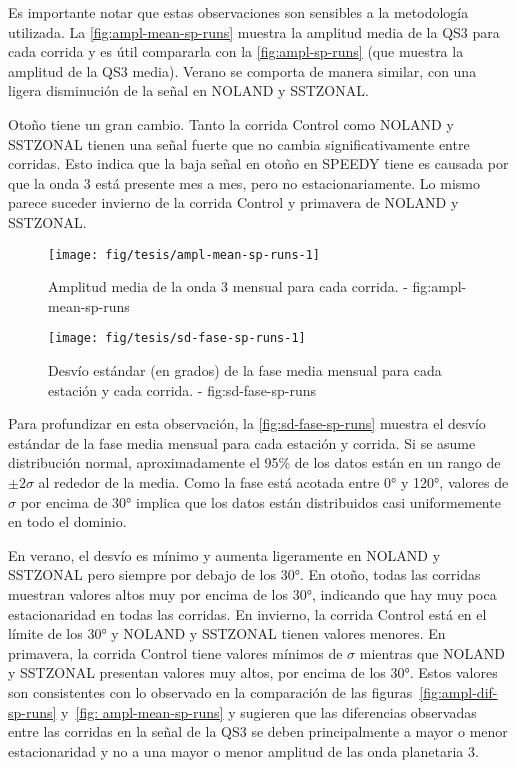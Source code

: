 \documentclass[spanish,a4paper,12p]{book}
\begin{document}
Es importante notar que estas observaciones son sensibles a la
metodología utilizada. La \autoref{fig:ampl-mean-sp-runs} muestra la
amplitud media de la QS3 para cada corrida y es útil compararla con la
\autoref{fig:ampl-sp-runs} (que muestra la amplitud de la QS3 media).
Verano se comporta de manera similar, con una ligera disminución de la
señal en NOLAND y SSTZONAL.

Otoño tiene un gran cambio. Tanto la corrida Control como NOLAND y
SSTZONAL tienen una señal fuerte que no cambia significativamente entre
corridas. Esto indica que la baja señal en otoño en SPEEDY tiene es
causada por que la onda 3 está presente mes a mes, pero no
estacionariamente. Lo mismo parece suceder invierno de la corrida
Control y primavera de NOLAND y SSTZONAL.

\begin{figure*}
\texttt{[image: fig/tesis/ampl-mean-sp-runs-1]} \caption{Amplitud media de la onda 3 mensual para cada corrida. - fig:ampl-mean-sp-runs}\label{fig:ampl-mean-sp-runs}
\end{figure*}

\begin{figure*}
\texttt{[image: fig/tesis/sd-fase-sp-runs-1]} \caption{Desvío estándar (en grados) de la fase media mensual para cada estación y cada corrida. - fig:sd-fase-sp-runs}\label{fig:sd-fase-sp-runs}
\end{figure*}

Para profundizar en esta observación, la \autoref{fig:sd-fase-sp-runs}
muestra el desvío estándar de la fase media mensual para cada estación y
corrida. Si se asume distribución normal, aproximadamente el 95\% de los
datos están en un rango de \(\pm 2\sigma\) al rededor de la media. Como
la fase está acotada entre 0° y 120°, valores de \(\sigma\) por encima
de 30° implica que los datos están distribuidos casi uniformemente en
todo el dominio.

En verano, el desvío es mínimo y aumenta ligeramente en NOLAND y
SSTZONAL pero siempre por debajo de los 30°. En otoño, todas las
corridas muestran valores altos muy por encima de los 30°, indicando que
hay muy poca estacionaridad en todas las corridas. En invierno, la
corrida Control está en el límite de los 30° y NOLAND y SSTZONAL tienen
valores menores. En primavera, la corrida Control tiene valores mínimos
de \(\sigma\) mientras que NOLAND y SSTZONAL presentan valores muy
altos, por encima de los 30°. Estos valores son consistentes con lo
observado en la comparación de las figuras~\ref{fig:ampl-dif-sp-runs}
y~\ref{fig: ampl-mean-sp-runs} y sugieren que las diferencias observadas
entre las corridas en la señal de la QS3 se deben principalmente a mayor
o menor estacionaridad y no a una mayor o menor amplitud de las onda
planetaria 3.
\end{document}
